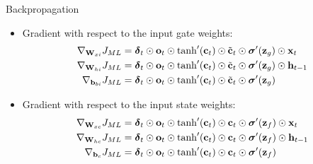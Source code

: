 \documentclass{beamer}
\begin{document}
\begin{frame}{Backpropagation}
\begin{itemize}
    \item Gradient with respect to the input gate weights:
    \begin{equation}
        \begin{split}
        \nabla_{{\bf W}_{xi}} J_{ML} &= {\boldsymbol \delta}_t \odot {\bf o}_t \odot \tanh'({\bf c}_t) \odot \tilde{{\bf c}}_t \odot {\boldsymbol \sigma}'({\bf z}_g)  \odot {\bf x}_t\\
    \nabla_{{\bf W}_{hi}} J_{ML} &=  {\boldsymbol \delta}_t \odot {\bf o}_t \odot \tanh'({\bf c}_t) \odot \tilde{{\bf c}}_t \odot {\boldsymbol \sigma}'({\bf z}_g)  \odot   {\bf h}_{t-1}\\
    \nabla_{{\bf b}_{bi}} J_{ML} & =  {\boldsymbol \delta}_t \odot {\bf o}_t \odot \tanh'({\bf c}_t) \odot \tilde{{\bf c}}_t \odot {\boldsymbol \sigma}'({\bf z}_g) 
        \end{split}
    \end{equation}

    \item Gradient with respect to the input state weights:
 \begin{equation}
    \begin{split}        
    \nabla_{{\bf W}_{xc}} J_{ML}  &=  {\boldsymbol \delta}_t \odot {\bf o}_t \odot \tanh'({\bf c}_t) \odot {\bf c}_t \odot {\boldsymbol \sigma}'({\bf z}_f)\odot {\bf x}_t\\
    \nabla_{{\bf W}_{hc}}  J_{ML} &=  {\boldsymbol \delta}_t \odot  {\bf o}_t \odot \tanh'({\bf c}_t) \odot {\bf c}_t \odot {\boldsymbol \sigma}'({\bf z}_f)\odot {\bf h}_{t-1}\\
   \nabla_{{\bf b}_{c}} J_{ML}  &=  {\boldsymbol \delta}_t \odot  {\bf o}_t \odot \tanh'({\bf c}_t) \odot {\bf c}_t \odot {\boldsymbol \sigma}'({\bf z}_f) \\
    \end{split}
    \end{equation}

\end{itemize}
    
\end{frame}
\end{document}
